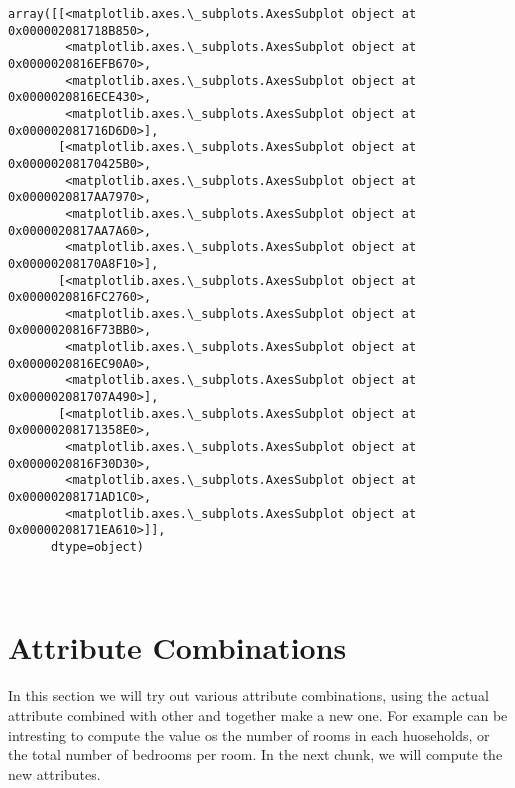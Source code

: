\documentclass[11pt]{article}
\makeatletter
\newcommand{\boxspacing}{\kern\kvtcb@left@rule\kern\kvtcb@boxsep}
\newcommand{\prompt}[4]{
        \ttfamily\llap{{\color{#2}[#3]:\hspace{3pt}#4}}\vspace{-\baselineskip}
    }
\makeatother
\begin{document}
            \begin{tcolorbox}[breakable, size=fbox, boxrule=.5pt, pad at break*=1mm, opacityfill=0]
\prompt{Out}{outcolor}{17}{\boxspacing}
\begin{Verbatim}[commandchars=\\\{\}]
array([[<matplotlib.axes.\_subplots.AxesSubplot object at 0x000002081718B850>,
        <matplotlib.axes.\_subplots.AxesSubplot object at 0x0000020816EFB670>,
        <matplotlib.axes.\_subplots.AxesSubplot object at 0x0000020816ECE430>,
        <matplotlib.axes.\_subplots.AxesSubplot object at 0x000002081716D6D0>],
       [<matplotlib.axes.\_subplots.AxesSubplot object at 0x00000208170425B0>,
        <matplotlib.axes.\_subplots.AxesSubplot object at 0x0000020817AA7970>,
        <matplotlib.axes.\_subplots.AxesSubplot object at 0x0000020817AA7A60>,
        <matplotlib.axes.\_subplots.AxesSubplot object at 0x00000208170A8F10>],
       [<matplotlib.axes.\_subplots.AxesSubplot object at 0x0000020816FC2760>,
        <matplotlib.axes.\_subplots.AxesSubplot object at 0x0000020816F73BB0>,
        <matplotlib.axes.\_subplots.AxesSubplot object at 0x0000020816EC90A0>,
        <matplotlib.axes.\_subplots.AxesSubplot object at 0x000002081707A490>],
       [<matplotlib.axes.\_subplots.AxesSubplot object at 0x00000208171358E0>,
        <matplotlib.axes.\_subplots.AxesSubplot object at 0x0000020816F30D30>,
        <matplotlib.axes.\_subplots.AxesSubplot object at 0x00000208171AD1C0>,
        <matplotlib.axes.\_subplots.AxesSubplot object at 0x00000208171EA610>]],
      dtype=object)
\end{Verbatim}
\end{tcolorbox}
        
    \begin{center}
    \end{center}
    { \hspace*{\fill} \\}
    
    \hypertarget{attribute-combinations}{%
\section{Attribute Combinations}\label{attribute-combinations}}

    In this section we will try out various attribute combinations, using
the actual attribute combined with other and together make a new one.
For example can be intresting to compute the value os the number of
rooms in each huoseholds, or the total number of bedrooms per room. In
the next chunk, we will compute the new attributes.
\end{document}
